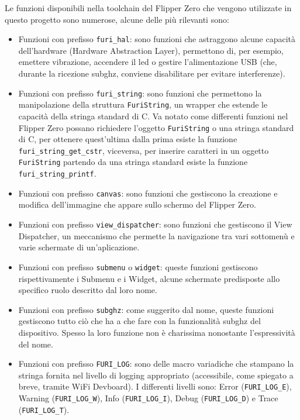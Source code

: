 Le funzioni disponibili nella toolchain del Flipper Zero che vengono utilizzate in questo progetto sono numerose, alcune delle più rilevanti sono:
\begin{itemize}
  \item Funzioni con prefisso \texttt{furi\_hal}: sono funzioni che astraggono alcune capacità dell'hardware (Hardware Abstraction Layer), permettono di, per esempio, emettere vibrazione, accendere il led o gestire l'alimentazione USB (che, durante la ricezione subghz, conviene disabilitare per evitare interferenze).
  \item Funzioni con prefisso \texttt{furi\_string}: sono funzioni che permettono la manipolazione della struttura \texttt{FuriString}, un wrapper che estende le capacità della stringa standard di C. Va notato come differenti funzioni nel Flipper Zero possano richiedere l'oggetto \texttt{FuriString} o una stringa standard di C, per ottenere quest'ultima dalla prima esiste la funzione \texttt{furi\_string\_get\_cstr}, viceversa, per inserire caratteri in un oggetto \texttt{FuriString} partendo da una stringa standard esiste la funzione \texttt{furi\_string\_printf}.
  \item Funzioni con prefisso \texttt{canvas}: sono funzioni che gestiscono la creazione e modifica dell'immagine che appare sullo schermo del Flipper Zero.
  \item Funzioni con prefisso \texttt{view\_dispatcher}: sono funzioni che gestiscono il View Dispatcher, un meccanismo che permette la navigazione tra vari sottomenù e varie schermate di un'aplicazione.
  \item Funzioni con prefisso \texttt{submenu} o \texttt{widget}: queste funzioni gestiscono rispettivamente i Submenu e i Widget, alcune schermate predisposte allo specifico ruolo descritto dal loro nome.
  \item Funzioni con prefisso \texttt{subghz}: come suggerito dal nome, queste funzioni gestiscono tutto ciò che ha a che fare con la funzionalità subghz del dispositivo. Spesso la loro funzione non è charissima nonostante l'espressività del nome.
  \item Funzioni con prefisso \texttt{FURI\_LOG}: sono delle macro variadiche che stampano la stringa fornita nel livello di logging appropriato (accessibile, come spiegato a breve, tramite WiFi Devboard). I differenti livelli sono: Error (\texttt{FURI\_LOG\_E}), Warning (\texttt{FURI\_LOG\_W}), Info (\texttt{FURI\_LOG\_I}), Debug (\texttt{FURI\_LOG\_D}) e Trace (\texttt{FURI\_LOG\_T}).
\end{itemize}


